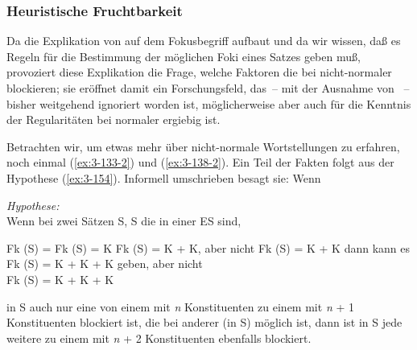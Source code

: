 \documentclass[output=paper]{langsci/langscibook}
\begin{document}
\subsubsection{Heuristische Fruchtbarkeit}
\label{subsubsec:3-2-3-2}

Da die Explikation von  auf
dem Fokusbegriff aufbaut und da wir wissen, daß es Regeln für die
Bestimmung der möglichen Foki eines Satzes geben muß, provoziert diese
Explikation die Frage, welche Faktoren die  bei
nicht-normaler  blockieren; sie eröffnet damit ein
Forschungsfeld, das~-- mit der Ausnahme von \citet{Contreras76}~-- bisher
weitgehend ignoriert worden ist, möglicherweise aber auch für die
Kenntnis der Regularitäten bei normaler  ergiebig ist.

Betrachten wir, um etwas mehr über nicht-normale Wortstellungen zu
erfahren, noch einmal (\ref{ex:3-133-2}) und (\ref{ex:3-138-2}). Ein Teil der Fakten folgt aus
der Hypothese (\ref{ex:3-154}). Informell umschrieben besagt sie: Wenn
\begin{exe}
\ex
\label{ex:3-154}
\textit{Hypothese:} \\
Wenn bei zwei Sätzen S, S die in einer ES sind,
\begin{xlist}
\ex
\label{ex:3-154a}
Fk (S) = Fk (S) = K
\ex
\label{ex:3-154b}
Fk (S) = K + K, aber nicht Fk (S) = K + K
\ex
\label{ex:3-154c}
dann kann es Fk (S) = K + K + K geben, aber nicht\\
Fk (S) = K + K + K
\end{xlist}
\end{exe}
in S auch nur eine  von einem  mit \textit{n}
Konstituenten zu einem  mit \textit{n} + 1 Konstituenten blockiert ist,
die bei anderer  (in S) möglich ist, dann ist in S
jede weitere  zu einem  mit \textit{n} + 2 Konstituenten
ebenfalls blockiert.
\end{document}
